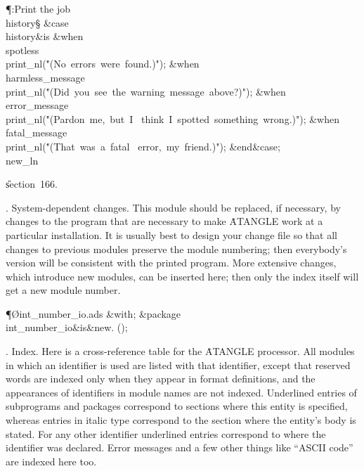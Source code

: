 \Y\P\?\4:Print the job \\{history}\X\S\?\6
\&{case}\1\8\\{history}\1\8\&{is}\8\6
\4\&{when}\8\\{spotless}\KR\8\\{print\_nl}\?\1(\?\.{"(No\ errors\ were\
found.)"}\?\2)\?;\6
\4\&{when}\8\\{harmless\_message}\KR\8\\{print\_nl}\?\1(\?\.{"(Did\ you\ see\
the\ warning\ message\ above?)"}\?\2)\?;\6
\4\&{when}\8\\{error\_message}\KR\8\\{print\_nl}\?\1(\?\.{"(Pardon\ me,\ but\ I%
\ think\ I\ spotted\ something\ wrong.)"}\?\2)\?;\6
\4\&{when}\8\\{fatal\_message}\KR\8\\{print\_nl}\?\1(\?\.{"(That\ was\ a\ fatal%
\ error,\ my\ friend.)"}\?\2)\?;\2\6
\4\2\&{end}\8\&{case};\C{there are no other cases}\6
\\{new\_ln}\par
\U section~166\*.\fi

\*.  System-dependent changes.
This module should be replaced, if necessary, by changes to the program
that are necessary to make \.{ATANGLE} work at a particular installation.
It is usually best to design your change file so that all changes to
previous modules preserve the module numbering; then everybody's version
will be consistent with the printed program. More extensive changes,
which introduce new modules, can be inserted here; then only the index
itself will get a new module number.

\Y\P\O{int\_number\_io.ads}\?\6
\?\&{with}\8;\6
\&{package}\8\1\\{int\_number\_io}\?\8\&{is}\8\&{new}\?\8\?.\?%
\p{INTEGER\_IO}\?\1(\?\?\2)\?\2;\par
\fi

\*.  Index.
Here is a cross-reference table for the \.{ATANGLE} processor.
All modules in which an identifier is
used are listed with that identifier, except that reserved words are
indexed only when they appear in format definitions, and the appearances
of identifiers in module names are not indexed.
Underlined entries of subprograms and packages correspond to sections where
this entity is specified, whereas entries in italic type correspond to
the section where the entity's body is stated.
For any other identifier underlined entries correspond to where the
identifier was declared. Error messages and
a few other things like ``ASCII code'' are indexed here too.





